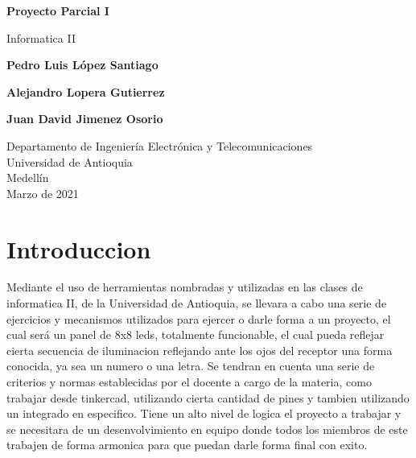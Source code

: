 \documentclass{article}
\begin{document}
\begin{titlepage}
    \begin{center}
        \vspace*{1cm}
            
        \Huge
        \textbf{Proyecto Parcial I}
            
        \vspace{0.5cm}
        \LARGE
        Informatica II
            
        \vspace{1.5cm}
            
        \textbf{Pedro Luis López Santiago}
        
        \textbf{Alejandro Lopera Gutierrez}
        
        \textbf{Juan David Jimenez Osorio}        
        
        \vfill
            
        \vspace{0.8cm}
            
        \Large
        Departamento de Ingeniería Electrónica y Telecomunicaciones\\
        Universidad de Antioquia\\
        Medellín\\
        Marzo de 2021
            
    \end{center}
\end{titlepage}

\tableofcontents
\newpage
\section{Introduccion}\label{intro}
Mediante el uso de herramientas nombradas y utilizadas en las clases de informatica II, de la Universidad de Antioquia, se llevara a cabo una serie de ejercicios y mecanismos utilizados para ejercer o darle forma a un proyecto, el cual será un panel de 8x8 leds, totalmente funcionable, el cual pueda reflejar cierta secuencia de iluminacion reflejando ante los ojos del receptor una forma conocida, ya sea un numero o una letra.
Se tendran en cuenta una serie de criterios y normas establecidas por el docente a cargo de la materia, como trabajar desde tinkercad, utilizando cierta cantidad de pines y tambien utilizando un integrado en especifico.
Tiene un alto nivel de logica el proyecto a trabajar y se necesitara de un desenvolvimiento en equipo donde todos los miembros de este trabajen de forma armonica para que puedan darle forma final con exito.
\end{document}
